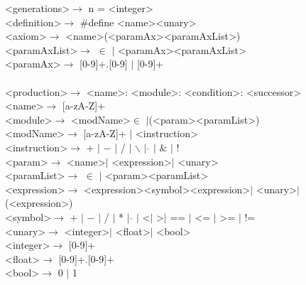 \textless generations\textgreater $\rightarrow$ n = \textless integer\textgreater \\
\textless definition\textgreater $\rightarrow$ \#define \textless name\textgreater \textless unary\textgreater \\
\textless axiom\textgreater $\rightarrow$ \textless name\textgreater (\textless paramAx\textgreater \textless paramAxList\textgreater) \\
\textless paramAxList\textgreater $\rightarrow$ $\in$ $|$ \textless paramAx\textgreater \textless paramAxList\textgreater \\
\textless paramAx\textgreater $\rightarrow$ [0-9]+.[0-9] $|$ [0-9]+ \\
\\
\textless production\textgreater $\rightarrow$ \textless name\textgreater : \textless module\textgreater : \textless condition\textgreater : \textless successor\textgreater \\
\textless name\textgreater $\rightarrow$ [a-zA-Z]+ \hfill \\
\textless module\textgreater $\rightarrow$ \textless modName\textgreater $\in$ $|$(\textless param\textgreater \textless paramList\textgreater) \\
\textless modName\textgreater $\rightarrow$ [a-zA-Z]+ $|$ \textless instruction\textgreater \\
\textless instruction\textgreater $\rightarrow$ $+$ $|$ $-$ $|$ / $|$ $\backslash$ $|$ $\hat{}$ $|$ $\&$ $|$ ! \\
\textless param\textgreater $\rightarrow$ \textless name\textgreater $|$ \textless expression\textgreater $|$ \textless unary\textgreater \\
\textless paramList\textgreater $\rightarrow$ $\in$ $|$ \textless param\textgreater \textless paramList\textgreater \\
\textless expression\textgreater $\rightarrow$ \textless expression\textgreater \textless symbol\textgreater \textless expression\textgreater $|$ \textless unary\textgreater $|$ (\textless expression\textgreater) \\
\textless symbol\textgreater $\rightarrow$ $+$ $|$ $-$ $|$ / $|$ * $|$ $\hat{}$ $|$ \textless $|$ \textgreater $|$ == $|$ \textless = $|$ \textgreater = $|$ != \\
\textless unary\textgreater $\rightarrow$ \textless integer\textgreater $|$ \textless float\textgreater $|$ \textless bool\textgreater\\
\textless integer\textgreater $\rightarrow$ [0-9]+ \\
\textless float\textgreater $\rightarrow$ [0-9]+.[0-9]+ \\
\textless bool\textgreater $\rightarrow$ 0 $|$ 1 \\


